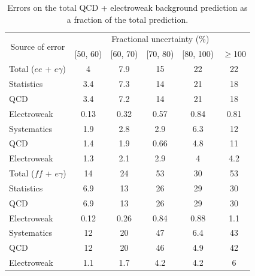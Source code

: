 \documentclass[dissertation.tex]{subfiles}
\begin{document}
\begin{table}[hcbp]
\caption{Errors on the total QCD + electroweak background prediction as a fraction of the total prediction.}
\centering
\begin{tabular}{|p{5cm}|c|c|c|c|c|}
\hline
\multicolumn{1}{|c|}{\multirow{2}{*}{Source of error}} & \multicolumn{5}{c|}{Fractional uncertainty (\%)} \\
\cline{2-6}
& [50, 60) & [60, 70) & [70, 80) & [80, 100) & $\geq$100 \\
\hline
\hline
Total ($ee$ + $e\gamma$) & 4 & 7.9 & 15 & 22 & 22 \\
\hline
\hspace{0.5cm}Statistics & 3.4 & 7.3 & 14 & 21 & 18 \\
\hline
\hspace{1cm}QCD & 3.4 & 7.2 & 14 & 21 & 18 \\
\hspace{1cm}Electroweak & 0.13 & 0.32 & 0.57 & 0.84 & 0.81 \\
\hline
\hspace{0.5cm}Systematics & 1.9 & 2.8 & 2.9 & 6.3 & 12 \\
\hline
\hspace{1cm}QCD & 1.4 & 1.9 & 0.66 & 4.8 & 11 \\
\hspace{1cm}Electroweak & 1.3 & 2.1 & 2.9 & 4 & 4.2 \\
\hline
Total ($\mathit{ff}$ + $e\gamma$) & 14 & 24 & 53 & 30 & 53 \\
\hline
\hspace{0.5cm}Statistics & 6.9 & 13 & 26 & 29 & 30 \\
\hline
\hspace{1cm}QCD & 6.9 & 13 & 26 & 29 & 30 \\
\hspace{1cm}Electroweak & 0.12 & 0.26 & 0.84 & 0.88 & 1.1 \\
\hline
\hspace{0.5cm}Systematics & 12 & 20 & 47 & 6.4 & 43 \\
\hline
\hspace{1cm}QCD & 12 & 20 & 46 & 4.9 & 42 \\
\hspace{1cm}Electroweak & 1.1 & 1.7 & 4.2 & 4.2 & 6 \\
\hline
\end{tabular}
\label{tab:total_background_prediction_errors}
\end{table}
\end{document}
